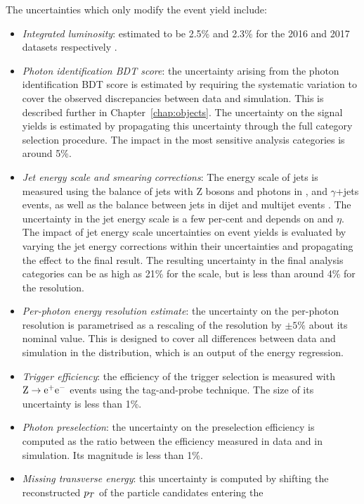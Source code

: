 The uncertainties which only modify the event yield include:
\begin{itemize}
\item \textit{Integrated luminosity}: 
  estimated to be 2.5\% and 2.3\% for the 2016 and 2017 datasets respectively \cite{Lumi2016,Lumi2017}.
\item \textit{Photon identification BDT score}: 
  the uncertainty arising from the photon identification BDT score 
  is estimated by requiring the systematic variation 
  to cover the observed discrepancies between data and simulation. 
  This is described further in Chapter~\ref{chap:objects}.
  The uncertainty on the signal yields is
  estimated by propagating this uncertainty through the full category selection procedure.
  The impact in the most sensitive analysis categories is around 5\%.
\item \textit{Jet energy scale and smearing corrections}: 
  The energy scale of jets is measured using the \pt balance of jets with Z bosons and photons in
  \Zee, \Zmumu and $\gamma$+jets events, as well as the \pt balance between jets 
  in dijet and multijet events \cite{JetsInRun2}. The uncertainty in the jet energy scale
  is a few per-cent and depends on \pt and $\eta$. The impact of jet energy scale uncertainties on 
  event yields is evaluated by varying the jet energy corrections within their uncertainties and 
  propagating the effect to the final result.
  The resulting uncertainty in the final analysis categories can be as high as 21\% 
  for the scale, but is less than around 4\% for the resolution.
\item \textit{Per-photon energy resolution estimate}: 
  the uncertainty on the per-photon resolution is
  parametrised as a rescaling of the resolution by
  $\pm 5\%$ about its nominal value. 
  This is designed to cover all differences between data and simulation 
  in the distribution, which is an output of the energy regression.
\item \textit{Trigger efficiency}: 
  the efficiency of the trigger selection is measured with 
  $\mathrm{Z}\rightarrow{\mathrm{e}^{+}\mathrm{e}^{-}}$ events using the tag-and-probe technique.
  The size of its uncertainty is less than 1\%.
\item \textit{Photon preselection}: 
  the uncertainty on the preselection efficiency
  is computed as the ratio between the efficiency measured in data and in simulation.
  Its magnitude is less than 1\%.
\item \textit{Missing transverse energy}: 
  this uncertainty is computed by shifting the
  reconstructed $p_T$ of the particle candidates entering the

\end{itemize}
